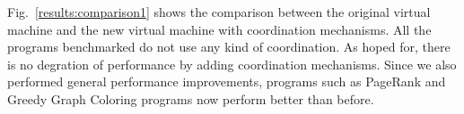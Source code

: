 Fig.~\ref{results:comparison1} shows the comparison between the original virtual
machine and the new virtual machine with coordination mechanisms. All the
programs benchmarked do not use any kind of coordination. As hoped for, there
is no degration of performance by adding coordination mechanisms. Since we also
performed general performance improvements, programs such as PageRank and Greedy
Graph Coloring programs now perform better than before.

\begin{topfig}
   \begin{center}
   \end{center}
\end{topfig}
